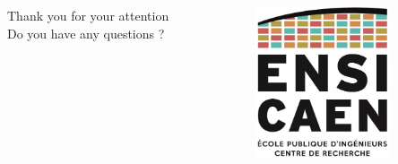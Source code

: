 \documentclass{beamer}
\begin{document}
\begin{frame}[plain]
  \begin{columns}
    \begin{column}{0.5\textwidth}
      \begin{flushright}
        
        {\huge\color{ensiblue}Thank you for your attention}\\
        Do you have any questions ?
      \end{flushright}
    \end{column}
    \begin{column}{0.5\textwidth}
      \begin{center}
        \includegraphics[width=4cm]{Resources/LogoEnsi.png}
      \end{center}
    \end{column}
  \end{columns}
\end{frame}
\end{document}

